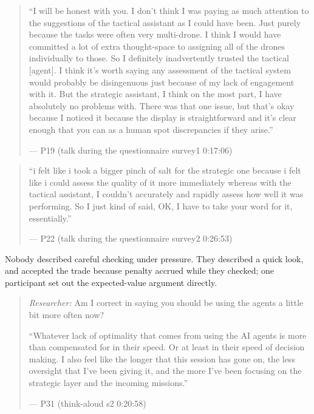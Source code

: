 \begin{quote}\small
``I will be honest with you. I don't think I was paying as much attention to the suggestions of the tactical assistant as I could have been. Just purely because the tasks were often very multi-drone. I think I would have committed a lot of extra thought-space to assigning all of the drones individually to those. So I definitely inadvertently trusted the tactical [agent]. I think it's worth saying any assessment of the tactical system would probably be disingenuous just because of my lack of engagement with it. But the strategic assistant, I think on the most part, I have absolutely no problems with. There was that one issue, but that's okay because I noticed it because the display is straightforward and it's clear enough that you can as a human spot discrepancies if they arise.''\par\hfill--- P19 (talk during the questionnaire survey1 0:17:06)
\end{quote}

\begin{quote}\small
``i felt like i took a bigger pinch of salt for the strategic one because i felt like i could assess the quality of it more immediately whereas with the tactical assistant, I couldn't accurately and rapidly assess how well it was performing. So I just kind of said, OK, I have to take your word for it, essentially.''\par\hfill--- P22 (talk during the questionnaire survey2 0:26:53)
\end{quote}


\label{sec:qual:trust-unchecked:glance}
Nobody described careful checking under pressure. They described a quick look, and accepted the trade because penalty accrued while they checked; one participant set out the expected-value argument directly.

\begin{quote}\small
{\footnotesize\textit{Researcher:} Am I correct in saying you should be using the agents a little bit more often now?}\par\smallskip
``Whatever lack of optimality that comes from using the AI agents is more than compensated for in their speed. Or at least in their speed of decision making. I also feel like the longer that this session has gone on, the less oversight that I've been giving it, and the more I've been focusing on the strategic layer and the incoming missions.''\par\hfill--- P31 (think-aloud s2 0:20:58)
\end{quote}

